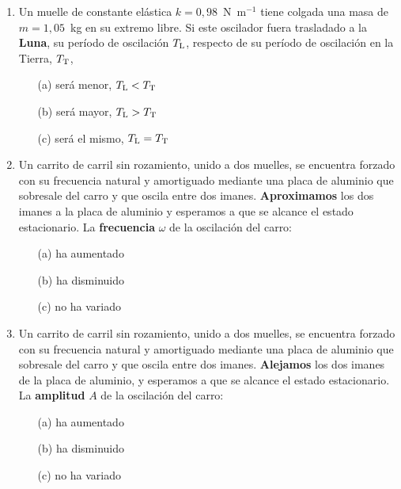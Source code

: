 \documentclass[11pt]{articulo}
\begin{document}
\begin{enumerate}
\item  Un muelle de constante el\'astica $k=0,98$~N~m$^{-1}$ tiene colgada una masa de $m=1,05$~kg en su extremo libre. 
Si este oscilador fuera trasladado a la {\bf Luna}, su per\'iodo de oscilaci\'on  $T_{\rm L}$, respecto de su per\'iodo de oscilaci\'on en la Tierra, $T_{\rm T}$,
\begin{enumerate}
\item[(a)] \fbox{$\, \phantom{-}\, $} \hspace*{1cm}   ser\'a menor, $T_{\rm L} <  T_{\rm T}$ 
\item[(b)] \fbox{$\, \phantom{-}\, $} \hspace*{1cm}   ser\'a mayor,   $T_{\rm L} >   T_{\rm T}$
\item[(c)] \fbox{$\, \phantom{-}\, $} \hspace*{1cm}   ser\'a el mismo, $T_{\rm L} =  T_{\rm T}$  %
\end{enumerate}

\item Un carrito de carril sin rozamiento, unido a dos muelles, se encuentra forzado
con su frecuencia natural y amortiguado mediante una placa de aluminio que sobresale
del carro y que oscila entre dos imanes. {\bf Aproximamos} los dos imanes a la placa
de aluminio y esperamos a que se alcance el estado estacionario. La {\bf frecuencia}
$\omega$ de la oscilaci\'on del carro:
\begin{enumerate}
\item[(a)] \fbox{$\, \phantom{-}\, $} \hspace*{1cm}   ha aumentado
\item[(b)] \fbox{$\, \phantom{-}\, $} \hspace*{1cm}   ha disminuido
\item[(c)] \fbox{$\, \phantom{-}\, $} \hspace*{1cm}   no ha variado  %
\end{enumerate}

\item Un carrito de carril sin rozamiento, unido a dos muelles, se encuentra forzado
con su frecuencia natural y amortiguado mediante una placa de aluminio que sobresale
del carro y que oscila entre dos imanes. {\bf Alejamos} los dos imanes de la placa
de aluminio, y esperamos a que se alcance el estado estacionario. La {\bf amplitud}
$A$ de la oscilaci\'on del carro:
\begin{enumerate}
\item[(a)] \fbox{$\, \phantom{-}\, $} \hspace*{1cm}   ha aumentado  %
\item[(b)] \fbox{$\, \phantom{-}\, $} \hspace*{1cm}   ha disminuido
\item[(c)] \fbox{$\, \phantom{-}\, $} \hspace*{1cm}   no ha variado
\end{enumerate}


\end{enumerate}
\end{document}
